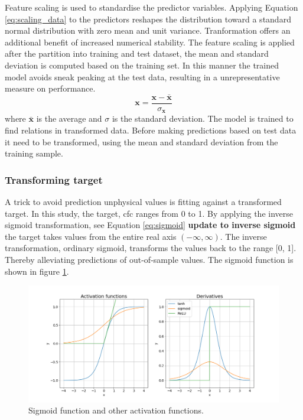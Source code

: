 Feature scaling is used to standardise the predictor variables.
Applying Equation \ref{eq:scaling_data} to the predictors reshapes the distribution toward a standard normal distribution with zero mean and unit variance. 
Tranformation offers an additional benefit of increased numerical stability. %
The feature scaling is applied after the partition into training and test dataset, the mean and standard deviation is computed based on the training set. In this manner the trained model avoids sneak peaking at the test data, resulting in a unrepresentative measure on performance.
\begin{equation} \label{eq:scaling_data}
    \mathbf{x} = \frac{\mathbf{x} - \bar{\mathbf{x}}}{\sigma_{\mathbf{x}}}
\end{equation}
where $\bar{\mathbf{x}}$ is the average and $\sigma$ is the standard deviation. The model is trained to find relations in transformed data. Before making predictions based on test data it need to be transformed, using the mean and standard deviation from the training sample.

\subsubsection{Transforming target} \label{sec:transforming_target}
A trick to avoid prediction unphysical values is fitting against a transformed target. In this study, the target, \acrfull{cfc} ranges from 0 to 1. By applying the inverse sigmoid transformation, see Equation \ref{eq:sigmoid} \textbf{update to inverse sigmoid} the target takes values from the entire real axis $(-\infty, \infty)$. 
The inverse transformation, ordinary sigmoid, transforms the values back to the range [0, 1]. Thereby alleviating predictions of out-of-sample values. The sigmoid function is shown in figure \ref{fig:activation_func_plus}. 
\begin{figure}
    \centering
    \includegraphics[scale=0.45]{Chapter3_Method/figs/activation_functions_and_derivatives.png}
    \caption{Sigmoid function and other activation functions.}
    \label{fig:activation_func_plus}
\end{figure}

